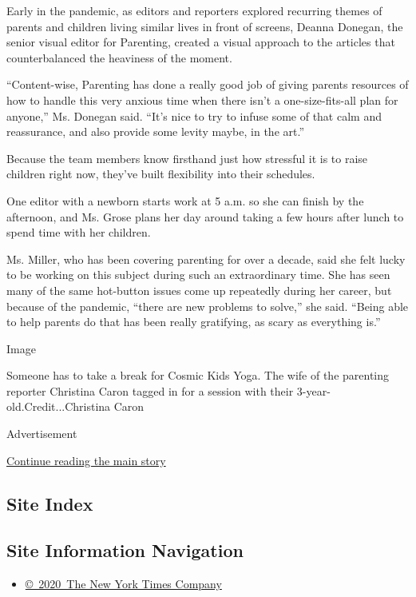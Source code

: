 Early in the pandemic, as editors and reporters explored recurring
themes of parents and children living similar lives in front of screens,
Deanna Donegan, the senior visual editor for Parenting, created a visual
approach to the articles that counterbalanced the heaviness of the
moment.

``Content-wise, Parenting has done a really good job of giving parents
resources of how to handle this very anxious time when there isn't a
one-size-fits-all plan for anyone,'' Ms. Donegan said. ``It's nice to
try to infuse some of that calm and reassurance, and also provide some
levity maybe, in the art.''

Because the team members know firsthand just how stressful it is to
raise children right now, they've built flexibility into their
schedules.

One editor with a newborn starts work at 5 a.m. so she can finish by the
afternoon, and Ms. Grose plans her day around taking a few hours after
lunch to spend time with her children.

Ms. Miller, who has been covering parenting for over a decade, said she
felt lucky to be working on this subject during such an extraordinary
time. She has seen many of the same hot-button issues come up repeatedly
during her career, but because of the pandemic, ``there are new problems
to solve,'' she said. ``Being able to help parents do that has been
really gratifying, as scary as everything is.''

Image

Someone has to take a break for Cosmic Kids Yoga. The wife of the
parenting reporter Christina Caron tagged in for a session with their
3-year-old.Credit...Christina Caron

Advertisement

\protect\hyperlink{after-bottom}{Continue reading the main story}

\hypertarget{site-index}{%
\subsection{Site Index}\label{site-index}}

\hypertarget{site-information-navigation}{%
\subsection{Site Information
Navigation}\label{site-information-navigation}}

\begin{itemize}
\tightlist
\item
  \href{https://help.nytimes3xbfgragh.onion/hc/en-us/articles/115014792127-Copyright-notice}{©~2020~The
  New York Times Company}
\end{itemize}

